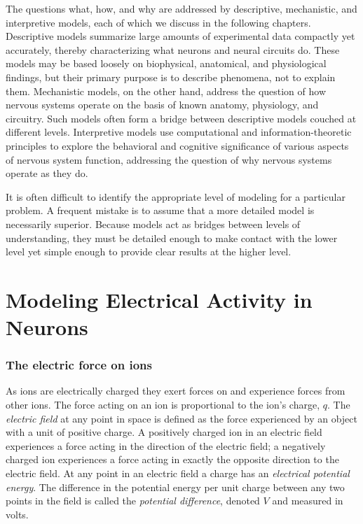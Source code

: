 The questions what, how, and why are addressed by descriptive, mechanistic, and interpretive models, each of which we discuss in the following chapters. Descriptive models summarize large amounts of experimental data compactly yet accurately, thereby characterizing what neurons and neural circuits do. These models may be based loosely on biophysical, anatomical, and physiological findings, but their primary purpose is to describe phenomena, not to explain them. Mechanistic models, on the other hand, address the question of how nervous systems operate on the basis of known anatomy, physiology, and circuitry. Such models often form a bridge between descriptive models couched at different levels. Interpretive models use computational and information-theoretic principles to explore the behavioral and cognitive significance of various aspects of nervous system function, addressing the question of why nervous systems operate as they do.

It is often difficult to identify the appropriate level of modeling for a particular problem. A frequent mistake is to assume that a more detailed model is necessarily superior. Because models act as bridges between levels of understanding, they must be detailed enough to make contact with the lower level yet simple enough to provide clear results at the higher level.

\section{Modeling Electrical Activity in Neurons}

\subsubsection{The electric force on ions}

As ions are electrically charged they exert forces on and experience forces from other ions. The force acting on an ion is proportional to the ion’s charge, $q$. The \textit{electric field} at any point in space is defined as the force experienced by an object with a unit of positive charge. A positively charged ion in an electric field experiences a force acting in the direction of the electric field; a negatively charged ion experiences a force acting in exactly the opposite direction to the electric field. At any point in an electric field a charge has an \textit{electrical potential energy}. The difference in the potential energy per unit charge between any two points in the field is called the \textit{potential difference}, denoted $V$ and measured in volts.

